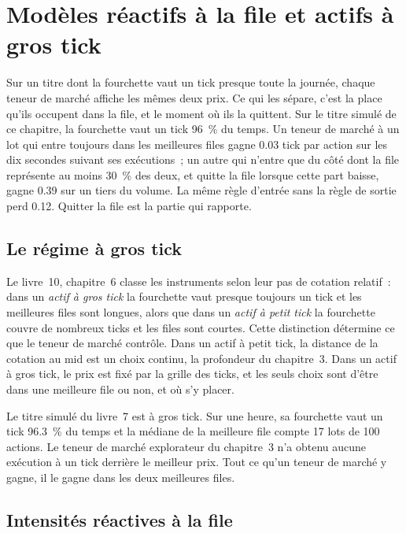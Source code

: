 \chapter{Modèles réactifs à la file et actifs à gros tick}\label{ch:hf:queue-reactive-models-and-large-tick-assets}

Sur un titre dont la fourchette vaut un tick presque toute la journée, chaque teneur de marché affiche les mêmes deux prix. Ce qui les sépare, c'est la place qu'ils occupent dans la
file, et le moment où ils la quittent. Sur le titre simulé de ce chapitre, la fourchette vaut un tick 96~\% du temps. Un teneur de marché à un lot qui entre toujours dans les
meilleures files gagne 0.03 tick par action sur les dix secondes suivant ses exécutions~; un autre qui n'entre que du côté dont la file représente au moins 30~\% des deux,
et quitte la file lorsque cette part baisse, gagne 0.39 sur un tiers du volume. La même règle d'entrée sans la règle de sortie perd 0.12. Quitter la file est la partie qui
rapporte.

\section{Le régime à gros tick}

Le livre~10, chapitre~6 classe les instruments selon leur pas de cotation relatif~: dans un \emph{actif à gros tick} la fourchette vaut presque toujours un tick
et les meilleures files sont longues, alors que dans un \emph{actif à petit tick} la fourchette couvre de nombreux ticks et les files sont courtes. Cette distinction détermine ce que le
teneur de marché contrôle. Dans un actif à petit tick, la distance de la cotation au mid est un choix continu, la profondeur du chapitre~3. Dans un actif à gros tick, le
prix est fixé par la grille des ticks, et les seuls choix sont d'être dans une meilleure file ou non, et où s'y placer.

Le titre simulé du livre~7 est à gros tick. Sur une heure, sa fourchette vaut un tick 96.3~\% du temps et la médiane de la meilleure file compte 17 lots de 100
actions. Le teneur de marché explorateur du chapitre~3 n'a obtenu aucune exécution à un tick derrière le meilleur prix. Tout ce qu'un teneur de marché y gagne, il le gagne dans les deux
meilleures files.

\section{Intensités réactives à la file}

